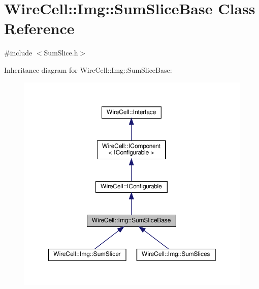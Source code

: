 \hypertarget{class_wire_cell_1_1_img_1_1_sum_slice_base}{}\section{Wire\+Cell\+:\+:Img\+:\+:Sum\+Slice\+Base Class Reference}
\label{class_wire_cell_1_1_img_1_1_sum_slice_base}


{\ttfamily \#include $<$Sum\+Slice.\+h$>$}



Inheritance diagram for Wire\+Cell\+:\+:Img\+:\+:Sum\+Slice\+Base\+:
\nopagebreak
\begin{figure}[H]
\begin{center}
\leavevmode
\includegraphics[width=350pt]{class_wire_cell_1_1_img_1_1_sum_slice_base__inherit__graph}
\end{center}
\end{figure}


